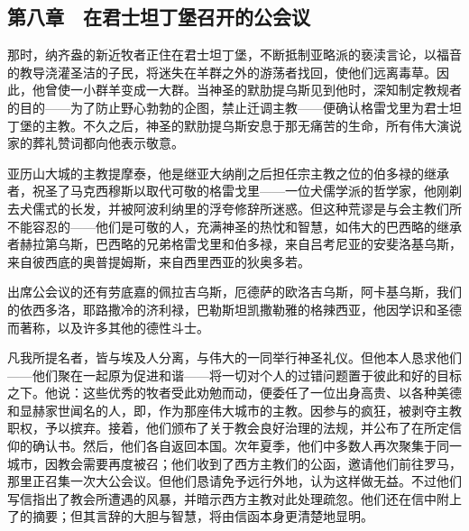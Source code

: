 
\subsection{第八章　在君士坦丁堡召开的公会议}

那时，纳齐盎的新近牧者正住在君士坦丁堡，不断抵制亚略派的亵渎言论，以福音的教导浇灌圣洁的子民，将迷失在羊群之外的游荡者找回，使他们远离毒草。因此，他曾使一小群羊变成一大群。当神圣的默肋提乌斯见到他时，深知制定教规者的目的——为了防止野心勃勃的企图，禁止迁调主教——便确认格雷戈里为君士坦丁堡的主教。不久之后，神圣的默肋提乌斯安息于那无痛苦的生命，所有伟大演说家的葬礼赞词都向他表示敬意。\par

亚历山大城的主教提摩泰，他是继亚大纳削之后担任宗主教之位的伯多禄的继承者，祝圣了马克西穆斯以取代可敬的格雷戈里——一位犬儒学派的哲学家，他刚剃去犬儒式的长发，并被阿波利纳里的浮夸修辞所迷惑。但这种荒谬是与会主教们所不能容忍的——他们是可敬的人，充满神圣的热忱和智慧，如伟大的巴西略的继承者赫拉第乌斯，巴西略的兄弟格雷戈里和伯多禄，来自吕考尼亚的安斐洛基乌斯，来自彼西底的奥普提姆斯，来自西里西亚的狄奥多若。\par

出席公会议的还有劳底嘉的佩拉吉乌斯，厄德萨的欧洛吉乌斯，阿卡基乌斯，我们的依西多洛，耶路撒冷的济利禄，巴勒斯坦凯撒勒雅的格辣西亚，他因学识和圣德而著称，以及许多其他的德性斗士。\par

凡我所提名者，皆与埃及人分离，与伟大的一同举行神圣礼仪。但他本人恳求他们——他们聚在一起原为促进和谐——将一切对个人的过错问题置于彼此和好的目标之下。他说：这些优秀的牧者受此劝勉而动，便委任了一位出身高贵、以各种美德和显赫家世闻名的人，即，作为那座伟大城市的主教。因参与的疯狂，被剥夺主教职权，予以摈弃。接着，他们颁布了关于教会良好治理的法规，并公布了在所定信仰的确认书。然后，他们各自返回本国。次年夏季，他们中多数人再次聚集于同一城市，因教会需要再度被召；他们收到了西方主教们的公函，邀请他们前往罗马，那里正召集一次大公会议。但他们恳请免予远行外地，认为这样做无益。不过他们写信指出了教会所遭遇的风暴，并暗示西方主教对此处理疏忽。他们还在信中附上了的摘要；但其言辞的大胆与智慧，将由信函本身更清楚地显明。\par

